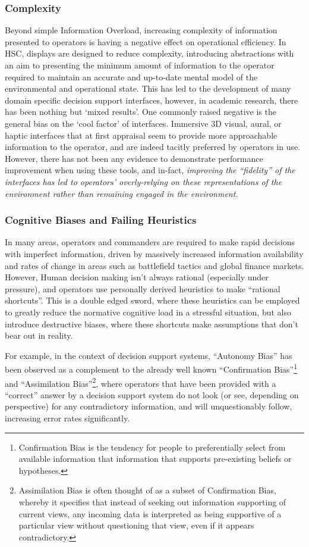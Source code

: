 \subsubsection{Complexity}
Beyond simple Information Overload, increasing complexity of information presented to operators is having a negative effect on operational efficiency.
In HSC, displays are designed to reduce complexity, introducing abstractions with an aim to presenting the minimum amount of information to the operator required to maintain an accurate and up-to-date mental model of the environmental and operational state.
This has led to the development of many domain specific decision support interfaces, however, in academic research, there has been nothing but ‘mixed results’.
One commonly raised negative is the general bias on the ‘cool factor’ of interfaces.
Immersive 3D visual, aural, or haptic interfaces that at first appraisal seem to provide more approachable information to the operator, and are indeed tacitly preferred by operators in use.
However, there has not been any evidence to demonstrate performance improvement when using these tools, and in-fact, \textit{improving the ``fidelity'' of the interfaces has led to operators’ overly-relying on these representations of the environment rather than remaining engaged in the environment.}

\subsubsection{Cognitive Biases and Failing Heuristics}
In many areas, operators and commanders are required to make rapid decisions with imperfect information, driven by massively increased information availability and rates of change in areas such as battlefield tactics and global finance markets.
However, Human decision making isn’t always rational (especially under pressure), and operators use personally derived heuristics to make ``rational shortcuts''.
This is a double edged sword, where these heuristics can be employed to greatly reduce the normative cognitive load in a stressful situation, but also introduce destructive biases, where these shortcuts make assumptions that don’t bear out in reality.

For example, in the context of decision support systems, ``Autonomy Bias'' has been observed as a complement to the already well known ``Confirmation Bias''\footnote{Confirmation Bias is the tendency for people to preferentially select from available information that information that supports pre-existing beliefs or hypotheses.}  and ``Assimilation Bias''\footnote{Assimilation Bias is often thought of as a subset of Confirmation Bias, whereby it specifies that instead of seeking out information supporting of current views, any incoming data is interpreted as being supportive of a particular view without questioning that view, even if it appears contradictory.}, where operators that have been provided with a ``correct'' answer by a decision support system do not look (or see, depending on perspective) for any contradictory information, and will unquestionably follow, increasing error rates significantly.

